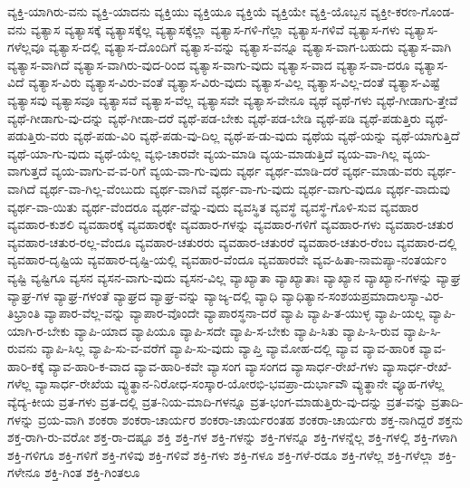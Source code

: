 {ವ್ಯಕ್ತಿ-ಯಾಗಿರು-ವನು
ವ್ಯಕ್ತಿ-ಯಾದನು
ವ್ಯಕ್ತಿಯು
ವ್ಯಕ್ತಿಯೂ
ವ್ಯಕ್ತಿಯೆ
ವ್ಯಕ್ತಿಯೇ
ವ್ಯಕ್ತಿ-ಯೊಬ್ಬನ
ವ್ಯಕ್ತೀ-ಕರಣ-ಗೊಂಡ-ವನು
ವ್ಯತ್ಯಾಸ
ವ್ಯತ್ಯಾಸಕ್ಕೆ
ವ್ಯತ್ಯಾಸಕ್ಕೆಲ್ಲ
ವ್ಯತ್ಯಾಸಕ್ಕೆಲ್ಲಾ
ವ್ಯತ್ಯಾಸ-ಗಳಿ-ಗೆಲ್ಲಾ
ವ್ಯತ್ಯಾಸ-ಗಳಿವೆ
ವ್ಯತ್ಯಾಸ-ಗಳು
ವ್ಯತ್ಯಾಸ-ಗಳೆಲ್ಲವೂ
ವ್ಯತ್ಯಾಸ-ದಲ್ಲಿ
ವ್ಯತ್ಯಾಸ-ದೊಂದಿಗೆ
ವ್ಯತ್ಯಾಸ-ವನ್ನು
ವ್ಯತ್ಯಾಸ-ವನ್ನೂ
ವ್ಯತ್ಯಾಸ-ವಾಗ-ಬಹುದು
ವ್ಯತ್ಯಾಸ-ವಾಗಿ
ವ್ಯತ್ಯಾಸ-ವಾಗಿದೆ
ವ್ಯತ್ಯಾಸ-ವಾಗಿರು-ವುದ-ರಿಂದ
ವ್ಯತ್ಯಾಸ-ವಾಗು-ವುದು
ವ್ಯತ್ಯಾಸ-ವಾದ
ವ್ಯತ್ಯಾಸ-ವಾ-ದರೂ
ವ್ಯತ್ಯಾಸ-ವಿದೆ
ವ್ಯತ್ಯಾಸ-ವಿರು
ವ್ಯತ್ಯಾಸ-ವಿರು-ವಂತೆ
ವ್ಯತ್ಯಾಸ-ವಿರು-ವುದು
ವ್ಯತ್ಯಾಸ-ವಿಲ್ಲ
ವ್ಯತ್ಯಾಸ-ವಿಲ್ಲ-ದಂತೆ
ವ್ಯತ್ಯಾಸ-ವಿಷ್ಟೆ
ವ್ಯತ್ಯಾಸವು
ವ್ಯತ್ಯಾಸವೂ
ವ್ಯತ್ಯಾಸವೆ
ವ್ಯತ್ಯಾಸ-ವೆಲ್ಲ
ವ್ಯತ್ಯಾಸವೇ
ವ್ಯತ್ಯಾಸ-ವೇನೂ
ವ್ಯಥೆ
ವ್ಯಥೆ-ಗಳು
ವ್ಯಥೆ-ಗೀಡಾಗು-ತ್ತೇವೆ
ವ್ಯಥೆ-ಗೀಡಾಗು-ವು-ದನ್ನು
ವ್ಯಥೆ-ಗೀಡಾ-ದರೆ
ವ್ಯಥೆ-ಪಡ-ಬೇಕು
ವ್ಯಥೆ-ಪಡ-ಬೇಡಿ
ವ್ಯಥೆ-ಪಡಿ
ವ್ಯಥೆ-ಪಡುತ್ತಿರು
ವ್ಯಥೆ-ಪಡುತ್ತಿರು-ವರು
ವ್ಯಥೆ-ಪಡು-ವಿರಿ
ವ್ಯಥೆ-ಪಡು-ವು-ದಿಲ್ಲ
ವ್ಯಥೆ-ಪ-ಡು-ವುದು
ವ್ಯಥೆಯ
ವ್ಯಥೆ-ಯನ್ನು
ವ್ಯಥೆ-ಯಾಗುತ್ತಿದೆ
ವ್ಯಥೆ-ಯಾ-ಗು-ವುದು
ವ್ಯಥೆ-ಯೆಲ್ಲ
ವ್ಯಭಿ-ಚಾರವೇ
ವ್ಯಯ-ಮಾಡಿ
ವ್ಯಯ-ಮಾಡುತ್ತಿದೆ
ವ್ಯಯ-ವಾ-ಗಿಲ್ಲ
ವ್ಯಯ-ವಾಗುತ್ತದೆ
ವ್ಯಯ-ವಾಗು-ವ-ವ-ರಿಗೆ
ವ್ಯಯ-ವಾ-ಗು-ವುದು
ವ್ಯರ್ಥ
ವ್ಯರ್ಥ-ಮಾಡಿ-ದರೆ
ವ್ಯರ್ಥ-ಮಾಡು-ವರು
ವ್ಯರ್ಥ-ವಾಗಿದೆ
ವ್ಯರ್ಥ-ವಾ-ಗಿಲ್ಲ-ವೆಂಬುದು
ವ್ಯರ್ಥ-ವಾಗಿವೆ
ವ್ಯರ್ಥ-ವಾ-ಗು-ವುದು
ವ್ಯರ್ಥ-ವಾಗು-ವುದೂ
ವ್ಯರ್ಥ-ವಾದುವು
ವ್ಯರ್ಥ-ವಾ-ಯಿತು
ವ್ಯರ್ಥ-ವೆಂದರೂ
ವ್ಯರ್ಥ-ವೆನ್ನು-ವುದು
ವ್ಯವಸ್ಥಿತ
ವ್ಯವಸ್ಥೆ
ವ್ಯವಸ್ಥೆ-ಗೊಳಿ-ಸುವ
ವ್ಯವಹಾರ
ವ್ಯವಹಾರ-ಕುಶಲಿ
ವ್ಯವಹಾರಕ್ಕೆ
ವ್ಯವಹಾರಕ್ಕೇ
ವ್ಯವಹಾರ-ಗಳನ್ನು
ವ್ಯವಹಾರ-ಗಳಿಗೆ
ವ್ಯವಹಾರ-ಗಳು
ವ್ಯವಹಾರ-ಚತುರ
ವ್ಯವಹಾರ-ಚತುರ-ರಲ್ಲ-ವೆಂದೂ
ವ್ಯವಹಾರ-ಚತುರರು
ವ್ಯವಹಾರ-ಚತುರರೆ
ವ್ಯವಹಾರ-ಚತುರ-ರೆಂಬ
ವ್ಯವಹಾರ-ದಲ್ಲಿ
ವ್ಯವಹಾರ-ದೃಷ್ಟಿಯ
ವ್ಯವಹಾರ-ದೃಷ್ಟಿ-ಯಲ್ಲಿ
ವ್ಯವಹಾರ-ವೆಂದೂ
ವ್ಯವಹಾರವೇ
ವ್ಯವ-ಹಿತಾ-ನಾಮಪ್ಯಾ-ನಂತರ್ಯಂ
ವ್ಯಷ್ಟಿ
ವ್ಯಷ್ಟಿಗೂ
ವ್ಯಸನ
ವ್ಯಸನ-ವಾಗು-ವುದು
ವ್ಯಸನ-ವಿಲ್ಲ
ವ್ಯಾಖ್ಯಾತಾ
ವ್ಯಾಖ್ಯಾತಾಃ
ವ್ಯಾಖ್ಯಾನ
ವ್ಯಾಖ್ಯಾನ-ಗಳನ್ನು
ವ್ಯಾಘ್ರ
ವ್ಯಾಘ್ರ-ಗಳ
ವ್ಯಾಘ್ರ-ಗಳಂತೆ
ವ್ಯಾಘ್ರದ
ವ್ಯಾಘ್ರ-ವನ್ನು
ವ್ಯಾಜ್ಯ-ದಲ್ಲಿ
ವ್ಯಾಧಿ
ವ್ಯಾಧಿತ್ಯಾನ-ಸಂಶಯಪ್ರಮಾದಾಲಸ್ಯಾ-ವಿರ-ತಿಭ್ರಾಂತಿ
ವ್ಯಾಪಾರ-ವೆಲ್ಲ-ವನ್ನು
ವ್ಯಾಪಾರ-ವೊಂದೇ
ವ್ಯಾಪಾರಸ್ಥನಾ-ದರೆ
ವ್ಯಾಪಿ
ವ್ಯಾಪಿ-ತ-ಯುಳ್ಳ
ವ್ಯಾಪಿ-ಯಲ್ಲ
ವ್ಯಾಪಿ-ಯಾಗಿ-ರ-ಬೇಕು
ವ್ಯಾಪಿ-ಯಾದ
ವ್ಯಾಪಿಯೂ
ವ್ಯಾಪಿ-ಸದೇ
ವ್ಯಾಪಿ-ಸ-ಬೇಕು
ವ್ಯಾಪಿ-ಸಿತು
ವ್ಯಾಪಿ-ಸಿ-ರುವ
ವ್ಯಾಪಿ-ಸಿ-ರುವನು
ವ್ಯಾಪಿ-ಸಿಲ್ಲ
ವ್ಯಾಪಿ-ಸು-ವ-ವರೆಗೆ
ವ್ಯಾಪಿ-ಸು-ವುದು
ವ್ಯಾಪ್ತಿ
ವ್ಯಾಮೋಹ-ದಲ್ಲಿ
ವ್ಯಾವ
ವ್ಯಾವ-ಹಾರಿಕ
ವ್ಯಾವ-ಹಾರಿ-ಕಕ್ಕೆ
ವ್ಯಾವ-ಹಾರಿ-ಕ-ವಾದ
ವ್ಯಾವ-ಹಾರಿ-ಕವೇ
ವ್ಯಾಸಂಗ
ವ್ಯಾಸಂಗದ
ವ್ಯಾಸಾರ್ಧ-ರೇಖೆ-ಗಳು
ವ್ಯಾಸಾರ್ಧ-ರೇಖೆ-ಗಳೆಲ್ಲ
ವ್ಯಾಸಾರ್ಧ-ರೇಖೆಯ
ವ್ಯುತ್ಥಾನ-ನಿರೋಧ-ಸಂಸ್ಕಾರ-ಯೋರಭಿ-ಭವಪ್ರಾ-ದುರ್ಭಾವೌ
ವ್ಯುತ್ಥಾನೇ
ವ್ಯೂಹ-ಗಳೆಲ್ಲ
ವ್ಯೆದ್ಯ-ಕೀಯ
ವ್ರತ-ಗಳು
ವ್ರತ-ದಲ್ಲಿ
ವ್ರತ-ನಿಯ-ಮಾದಿ-ಗಳನ್ನೂ
ವ್ರತ-ಭಂಗ-ಮಾಡುತ್ತಿರು-ವು-ದನ್ನು
ವ್ರತ-ವನ್ನು
ವ್ರತಾದಿ-ಗಳನ್ನು
ವ್ರಯ-ವಾಗಿ
ಶಂಕರಾ
ಶಂಕರಾ-ಚಾರ್ಯರ
ಶಂಕರಾ-ಚಾರ್ಯರಂತಹ
ಶಂಕರಾ-ಚಾರ್ಯರು
ಶಕ್ತ-ನಾಗಿದ್ದರೆ
ಶಕ್ತನು
ಶಕ್ತ-ರಾಗಿ-ರು-ವರೋ
ಶಕ್ತ-ರಾ-ದಷ್ಟೂ
ಶಕ್ತಿ
ಶಕ್ತಿ-ಗಳ
ಶಕ್ತಿ-ಗಳನ್ನು
ಶಕ್ತಿ-ಗಳನ್ನೂ
ಶಕ್ತಿ-ಗಳನ್ನೆಲ್ಲ
ಶಕ್ತಿ-ಗಳಲ್ಲಿ
ಶಕ್ತಿ-ಗಳಾಗಿ
ಶಕ್ತಿ-ಗಳಿಗೂ
ಶಕ್ತಿ-ಗಳಿಗೆ
ಶಕ್ತಿ-ಗಳಿವು
ಶಕ್ತಿ-ಗಳಿವೆ
ಶಕ್ತಿ-ಗಳು
ಶಕ್ತಿ-ಗಳೂ
ಶಕ್ತಿ-ಗಳೆ-ರಡೂ
ಶಕ್ತಿ-ಗಳೆಲ್ಲ
ಶಕ್ತಿ-ಗಳೆಲ್ಲಾ
ಶಕ್ತಿ-ಗಳೇನೂ
ಶಕ್ತಿ-ಗಿಂತ
ಶಕ್ತಿ-ಗಿಂತಲೂ
}
